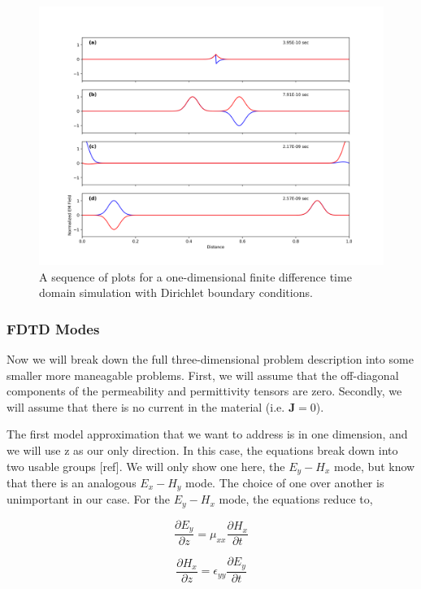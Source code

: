 \documentclass[a4paper]{article}
\begin{document}
\begin{figure}
    \centering
    \includegraphics[width=\textwidth]{./Figures/DirichletBC.png}
    \caption{A sequence of plots for a one-dimensional finite difference time domain simulation with Dirichlet boundary conditions.}
    \label{fig:Dirichlet}
\end{figure}

\subsubsection{FDTD Modes}

Now we will break down the full three-dimensional problem description into some smaller more maneagable problems. First, we will assume that the off-diagonal components of the permeability and permittivity tensors are zero. Secondly, we will assume that there is no current in the material (i.e. $\textbf{J}=0$). 

The first model approximation that we want to address is in one dimension, and we will use z as our only direction. In this case, the equations break down into two usable groups [ref]. We will only show one here, the $E_y-H_x$ mode, but know that there is an analogous $E_x-H_y$ mode. The choice of one over another is unimportant in our case. For the $E_y-H_x$ mode, the equations reduce to,

\begin{equation}
    \frac{\partial E_y}{\partial z} = \mu_{xx} \frac{\partial H_x}{\partial t}
\end{equation}

\begin{equation}
    \frac{\partial H_x}{\partial z} = \epsilon_{yy} \frac{\partial E_y}{\partial t}
\end{equation}
\end{document}
